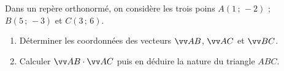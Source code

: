 \documentclass[a4paper,11pt]{article}
\begin{document}
\medskip

\exonum{}

\medskip

Dans un repère orthonormé, on considère les trois poins $A(1\,;\,-2)$ ; $B(5\,;\,-3)$ et $C(3\,;\,6)$.

\begin{enumerate}
	\item Déterminer les coordonnées des vecteurs $\vect{AB}$, $\vect{AC}$ et $\vect{BC}$.
	\item Calculer $\vect{AB}\cdot\vect{AC}$ puis en déduire la nature du triangle $ABC$.
\end{enumerate}

{\hfill{}~~\hfill~}
\end{document}
